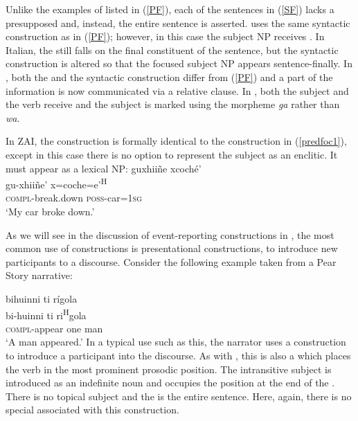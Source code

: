 Unlike the examples of  listed in (\ref{PF}), each of the sentences in (\ref{SF}) lacks a presupposed  and, instead, the entire sentence is asserted.  uses the same syntactic construction as in (\ref{PF}); however, in this case the subject NP receives . In Italian, the  still falls on the final constituent of the sentence, but the syntactic construction is altered so that the focused subject NP appears sentence-finally. In , both the  and the syntactic construction differ from (\ref{PF}) and a part of the information is now communicated via a relative clause.  In , both the subject and the verb receive  and the subject is marked using the morpheme \textit{ga} rather than \textit{wa}.

In ZAI, the construction is formally identical to the  construction in (\ref{predfoc1}), except in this case there is no option to represent the subject as an enclitic. It must appear as a lexical NP:
\ea 
\glll guxhii\~{n}e xcoch\'{e}' \\
gu-xhii\~{n}e' x=coche=e'\textsuperscript{H} \\
\textsc{compl}-break.down \textsc{poss}-car=\textsc{1sg} \\
\glt `My car broke down.'
\z

As we will see in the discussion of event-reporting constructions in , the most common use of  constructions is presentational constructions, to introduce new participants to a discourse. Consider the following example taken from a Pear Story narrative:

\ea
\glll bihuinni ti r\'{i}gola  \\
bi-huinni ti ri\textsuperscript{H}gola \\
\textsc{compl}-appear one man \\
\glt `A man appeared.' 
\z
In a typical use such as this, the narrator uses a  construction to introduce a participant into the discourse. As with , this is also a  which places the verb in the most prominent prosodic position. The intransitive subject is introduced as an indefinite noun and occupies the position at the end of the . There is no topical subject and the  is the entire sentence. Here, again, there is no special  associated with this construction.  


